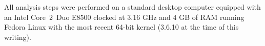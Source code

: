 All analysis steps were performed on a standard desktop computer equipped with
an Intel \mbox{Core 2 Duo} E8500 clocked at 3.16 GHz and 4 GB of RAM
running Fedora Linux with the most recent 64-bit kernel (3.6.10 at the time of
this writing). 

